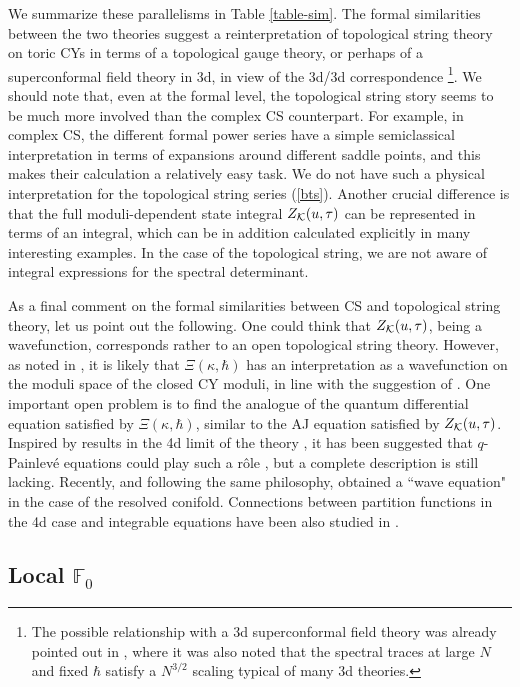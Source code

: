 \documentclass[a4paper,11pt]{article}
\theoremstyle{definition}
\newcommand{\CK}{{\cal K}}
\def\IF{{\mathbb F}}
\begin{document}
We summarize these parallelisms in Table \ref{table-sim}.  The formal
similarities between the two theories suggest a reinterpretation of
topological string theory on toric CYs in terms of a topological gauge
theory, or perhaps of a superconformal field theory in 3d, in view of the
3d/3d correspondence \cite{DGG1,ter-yama1}\footnote{The possible relationship with a 3d superconformal field 
theory was already pointed out in \cite{ghm}, where it was also noted that the spectral traces at large $N$ and fixed $\hbar$ 
satisfy a $N^{3/2}$ scaling typical of many 3d theories.}.
We should note that, even at the formal level, the topological string story seems to be
much more involved than the complex CS counterpart.  For example, 
in complex CS, the different formal power series have a simple
semiclassical interpretation in terms of expansions around different
saddle points, and this makes their calculation a relatively easy task. We do 
not have such a physical interpretation for the topological string series (\ref{bts}). 
Another crucial difference is that the full
moduli-dependent state integral $Z_\CK (u, \tau)$ can be represented in terms of an
integral, which can be in addition calculated explicitly in many
interesting examples. In the case of the topological string, we are
not aware of integral expressions for the spectral
determinant.

As a final comment on the formal similarities between CS and
topological string theory, let us point out the following.  One could
think that $Z_{\CK}(u, \tau)$, being a wavefunction, corresponds
rather to an open topological string theory. However, as noted in
\cite{mmrev}, it is likely that $\Xi(\kappa, \hbar)$ has an
interpretation as a wavefunction on the moduli space of the closed CY
moduli, in line with the suggestion of \cite{witten-bi}. One important
open problem is to find the analogue of the quantum differential
equation satisfied by $\Xi(\kappa, \hbar)$, similar to the AJ equation
satisfied by $Z_{\CK}(u, \tau)$. Inspired by results in the 4d limit
of the theory \cite{bgt}, it has been suggested that $q$-Painlev\'e
equations could play such a r\^ole \cite{bgt-qdef}, but a complete
description is still lacking. Recently, and following the same
philosophy, \cite{alim} obtained a ``wave equation" in the case of the
resolved conifold. Connections between partition functions in the
4d case and integrable equations have been also studied in
\cite{bdmt,teschner1,teschner2}.



\subsection{Local $\IF_0$}
\end{document}
